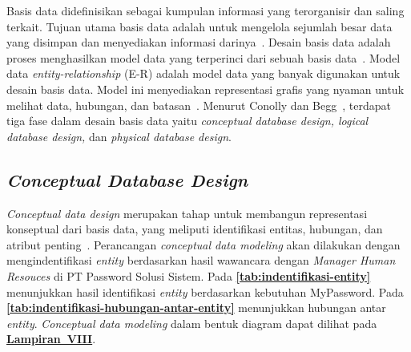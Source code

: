 Basis data didefinisikan sebagai kumpulan informasi yang terorganisir dan saling terkait. Tujuan utama basis data adalah untuk mengelola sejumlah besar data yang disimpan dan menyediakan informasi darinya~\cite{database2022jagdish}. Desain basis data adalah proses menghasilkan model data yang terperinci dari sebuah basis data~\cite{database2019date}. Model data \textit{entity-relationship} (E-R) adalah model data yang banyak digunakan untuk desain basis data. Model ini menyediakan representasi grafis yang nyaman untuk melihat data, hubungan, dan batasan~\cite{database2019abraham}. Menurut Conolly dan Begg~\cite{conolly2015database}, terdapat tiga fase dalam desain basis data yaitu \textit{conceptual database design, logical database design,} dan \textit{physical database design}.


\subsection{\textit{Conceptual Database Design}}
\textit{Conceptual data design} merupakan tahap untuk membangun representasi konseptual dari basis data, yang meliputi identifikasi entitas, hubungan, dan atribut penting~\cite{conolly2015database}. Perancangan \textit{conceptual data modeling} akan dilakukan dengan mengindentifikasi \textit{entity} berdasarkan hasil wawancara dengan \textit{Manager Human Resouces} di PT Password Solusi Sistem. Pada \textbf{\ref{tab:indentifikasi-entity}} menunjukkan hasil identifikasi \textit{entity} berdasarkan kebutuhan MyPassword. Pada \textbf{\ref{tab:indentifikasi-hubungan-antar-entity}} menunjukkan hubungan antar \textit{entity}. \textit{Conceptual data modeling} dalam bentuk diagram dapat dilihat pada \hyperref[sec:conceptual-database-design]{\textbf{Lampiran~VIII}}.
\FloatBarrier
